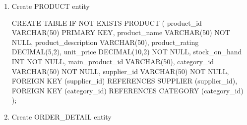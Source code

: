 \documentclass[
  letterpaper,
  DIV=11,
  numbers=noendperiod]{scrartcl}
\newenvironment{Shaded}{\begin{snugshade}}{\end{snugshade}}
\newcommand{\ControlFlowTok}[1]{\textcolor[rgb]{0.00,0.23,0.31}{#1}}
\newcommand{\DataTypeTok}[1]{\textcolor[rgb]{0.68,0.00,0.00}{#1}}
\newcommand{\DecValTok}[1]{\textcolor[rgb]{0.68,0.00,0.00}{#1}}
\newcommand{\KeywordTok}[1]{\textcolor[rgb]{0.00,0.23,0.31}{#1}}
\newcommand{\NormalTok}[1]{\textcolor[rgb]{0.00,0.23,0.31}{#1}}
\begin{document}
\begin{enumerate}
\def\labelenumi{\arabic{enumi}.}
\setcounter{enumi}{6}
\item
  Create PRODUCT entity

\begin{Shaded}
\begin{Highlighting}[]
\KeywordTok{CREATE} \KeywordTok{TABLE} \ControlFlowTok{IF} \KeywordTok{NOT} \KeywordTok{EXISTS}\NormalTok{ PRODUCT (}
\NormalTok{  product\_id }\DataTypeTok{VARCHAR}\NormalTok{(}\DecValTok{50}\NormalTok{) }\KeywordTok{PRIMARY} \KeywordTok{KEY}\NormalTok{, }
\NormalTok{  product\_name }\DataTypeTok{VARCHAR}\NormalTok{(}\DecValTok{50}\NormalTok{) }\KeywordTok{NOT} \KeywordTok{NULL}\NormalTok{,}
\NormalTok{  product\_description }\DataTypeTok{VARCHAR}\NormalTok{(}\DecValTok{50}\NormalTok{),}
\NormalTok{  product\_rating }\DataTypeTok{DECIMAL}\NormalTok{(}\DecValTok{5}\NormalTok{,}\DecValTok{2}\NormalTok{),}
\NormalTok{  unit\_price }\DataTypeTok{DECIMAL}\NormalTok{(}\DecValTok{10}\NormalTok{,}\DecValTok{2}\NormalTok{) }\KeywordTok{NOT} \KeywordTok{NULL}\NormalTok{,}
\NormalTok{  stock\_on\_hand }\DataTypeTok{INT} \KeywordTok{NOT} \KeywordTok{NULL}\NormalTok{,}
\NormalTok{  main\_product\_id }\DataTypeTok{VARCHAR}\NormalTok{(}\DecValTok{50}\NormalTok{),}
\NormalTok{  category\_id }\DataTypeTok{VARCHAR}\NormalTok{(}\DecValTok{50}\NormalTok{) }\KeywordTok{NOT} \KeywordTok{NULL}\NormalTok{,}
\NormalTok{  supplier\_id }\DataTypeTok{VARCHAR}\NormalTok{(}\DecValTok{50}\NormalTok{) }\KeywordTok{NOT} \KeywordTok{NULL}\NormalTok{,}
  \KeywordTok{FOREIGN} \KeywordTok{KEY}\NormalTok{ (supplier\_id) }\KeywordTok{REFERENCES}\NormalTok{ SUPPLIER (supplier\_id),}
  \KeywordTok{FOREIGN} \KeywordTok{KEY}\NormalTok{ (category\_id) }\KeywordTok{REFERENCES} \KeywordTok{CATEGORY}\NormalTok{ (category\_id)}
\NormalTok{);}
\end{Highlighting}
\end{Shaded}
\item
  Create ORDER\_DETAIL entity


\end{enumerate}
\end{document}
